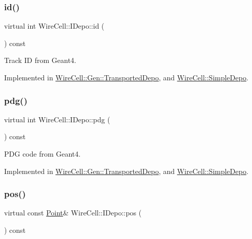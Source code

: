 \subsubsection{\texorpdfstring{id()}{id()}}
{\footnotesize\ttfamily virtual int Wire\+Cell\+::\+I\+Depo\+::id (\begin{DoxyParamCaption}{ }\end{DoxyParamCaption}) const\hspace{0.3cm}{\ttfamily [pure virtual]}}



Track ID from Geant4. 



Implemented in \hyperlink{class_wire_cell_1_1_gen_1_1_transported_depo_a90f1faf2049eea77065f41492c18256a}{Wire\+Cell\+::\+Gen\+::\+Transported\+Depo}, and \hyperlink{class_wire_cell_1_1_simple_depo_a30d9b06e6e65bba3d0b4fa17f64c52f5}{Wire\+Cell\+::\+Simple\+Depo}.

\mbox{\label{class_wire_cell_1_1_i_depo_a3a7a83ccfde95f79761cec6562fff82b}} 
\subsubsection{\texorpdfstring{pdg()}{pdg()}}
{\footnotesize\ttfamily virtual int Wire\+Cell\+::\+I\+Depo\+::pdg (\begin{DoxyParamCaption}{ }\end{DoxyParamCaption}) const\hspace{0.3cm}{\ttfamily [pure virtual]}}



P\+DG code from Geant4. 



Implemented in \hyperlink{class_wire_cell_1_1_gen_1_1_transported_depo_aa03cc0948c471aa8116e8ec62e284cea}{Wire\+Cell\+::\+Gen\+::\+Transported\+Depo}, and \hyperlink{class_wire_cell_1_1_simple_depo_a632331ca715c30e2600b2b115139fb0d}{Wire\+Cell\+::\+Simple\+Depo}.

\mbox{\label{class_wire_cell_1_1_i_depo_a6ea54d469c6d0429d16425917ec24241}} 
\subsubsection{\texorpdfstring{pos()}{pos()}}
{\footnotesize\ttfamily virtual const \hyperlink{namespace_wire_cell_ab2b2565fa6432efbb4513c14c988cda9}{Point}\& Wire\+Cell\+::\+I\+Depo\+::pos (\begin{DoxyParamCaption}{ }\end{DoxyParamCaption}) const\hspace{0.3cm}{\ttfamily [pure virtual]}}



